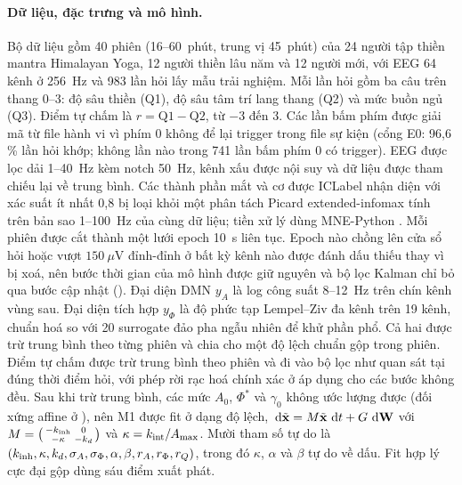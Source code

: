 \paragraph{Dữ liệu, đặc trưng và mô hình.} Bộ dữ liệu gồm 40 phiên (16--60~phút, trung vị 45~phút) của 24 người tập thiền mantra Himalayan Yoga, 12 người thiền lâu năm và 12 người mới, với EEG 64 kênh ở 256~Hz và 983 lần hỏi lấy mẫu trải nghiệm. Mỗi lần hỏi gồm ba câu trên thang 0--3: độ sâu thiền (Q1), độ sâu tâm trí lang thang (Q2) và mức buồn ngủ (Q3). Điểm tự chấm là $r=\mathrm{Q1}-\mathrm{Q2}$, từ $-3$ đến $3$. Các lần bấm phím được giải mã từ file hành vi vì phím 0 không để lại trigger trong file sự kiện (cổng E0: 96,6\,\% lần hỏi khớp; không lần nào trong 741 lần bấm phím 0 có trigger). EEG được lọc dải 1--40~Hz kèm notch 50~Hz, kênh xấu được nội suy và dữ liệu được tham chiếu lại về trung bình. Các thành phần mắt và cơ được ICLabel \citep{PionTonachini2019} nhận diện với xác suất ít nhất 0,8 bị loại khỏi một phân tách Picard extended-infomax \citep{Ablin2018} tính trên bản sao 1--100~Hz của cùng dữ liệu; tiền xử lý dùng MNE-Python \citep{Gramfort2013}. Mỗi phiên được cắt thành một lưới epoch 10~s liên tục. Epoch nào chồng lên cửa sổ hỏi hoặc vượt $150~\mu$V đỉnh-đỉnh ở bất kỳ kênh nào được đánh dấu thiếu thay vì bị xoá, nên bước thời gian của mô hình được giữ nguyên và bộ lọc Kalman chỉ bỏ qua bước cập nhật (). Đại diện DMN $y_A$ là log công suất 8--12~Hz trên chín kênh vùng sau. Đại diện tích hợp $y_\Phi$ là độ phức tạp Lempel--Ziv đa kênh \citep{Schartner2015} trên 19 kênh, chuẩn hoá so với 20 surrogate đảo pha ngẫu nhiên để khử phần phổ. Cả hai được trừ trung bình theo từng phiên và chia cho một độ lệch chuẩn gộp trong phiên. Điểm tự chấm được trừ trung bình theo phiên và đi vào bộ lọc như quan sát tại đúng thời điểm hỏi, với phép rời rạc hoá chính xác ở  áp dụng cho các bước không đều. Sau khi trừ trung bình, các mức $A_0$, $\Phi^*$ và $\gamma_0$ không ước lượng được (đối xứng affine ở ), nên M1 được fit ở dạng độ lệch, $\,\mathrm{d}\tilde{\mathbf{x}}=M\tilde{\mathbf{x}}\,\,\mathrm{d} t+G\,\,\mathrm{d}\mathbf W$ với $M=\bigl(\begin{smallmatrix}-k_{\mathrm{inh}}&0\\-\kappa&-k_{d}\end{smallmatrix}\bigr)$ và $\kappa=k_{\mathrm{int}}/A_{\max}$. Mười tham số tự do là $(k_{\mathrm{inh}},\kappa,k_{d},\sigma_{A},\sigma_{\Phi},\alpha,\beta,r_{A},r_{\Phi},r_{Q})$, trong đó $\kappa$, $\alpha$ và $\beta$ tự do về dấu. Fit hợp lý cực đại gộp dùng sáu điểm xuất phát.


